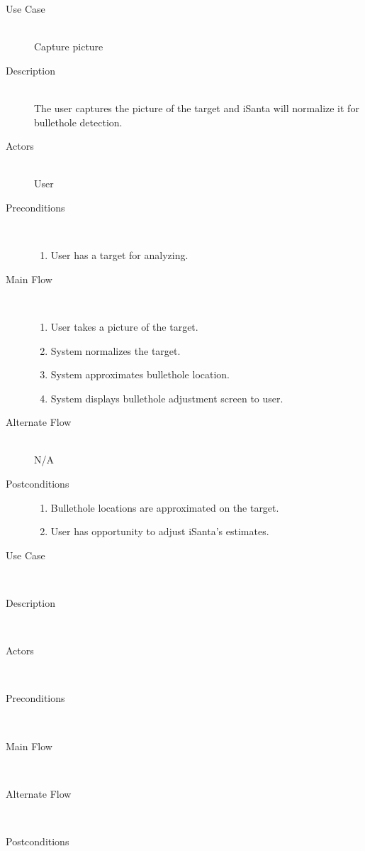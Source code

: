 \begin{description}
    \item[Use Case] \hfill \\
        Capture picture
    \item[Description] \hfill \\
        The user captures the picture of the target and iSanta will normalize it for bullethole detection.
    \item[Actors] \hfill \\
        User
    \item[Preconditions] \hfill \\
        \begin{enumerate}
            \item User has a target for analyzing.
        \end{enumerate}
    \item[Main Flow] \hfill \\
        \begin{enumerate}
            \item User takes a picture of the target.
            \item System normalizes the target.
            \item System approximates bullethole location.
            \item System displays bullethole adjustment screen to user.
        \end{enumerate}
    \item[Alternate Flow] \hfill \\
        N/A
    \item[Postconditions]
        \begin{enumerate}
            \item Bullethole locations are approximated on the target.
            \item User has opportunity to adjust iSanta's estimates.
        \end{enumerate}
\end{description}

\begin{description}
    \item[Use Case] \hfill \\
    \item[Description] \hfill \\
    \item[Actors] \hfill \\
    \item[Preconditions] \hfill \\
        \begin{enumerate}
        \end{enumerate}
    \item[Main Flow] \hfill \\
        \begin{enumerate}
        \end{enumerate}
    \item[Alternate Flow] \hfill \\
    \item[Postconditions]
        \begin{enumerate}
        \end{enumerate}
\end{description}
